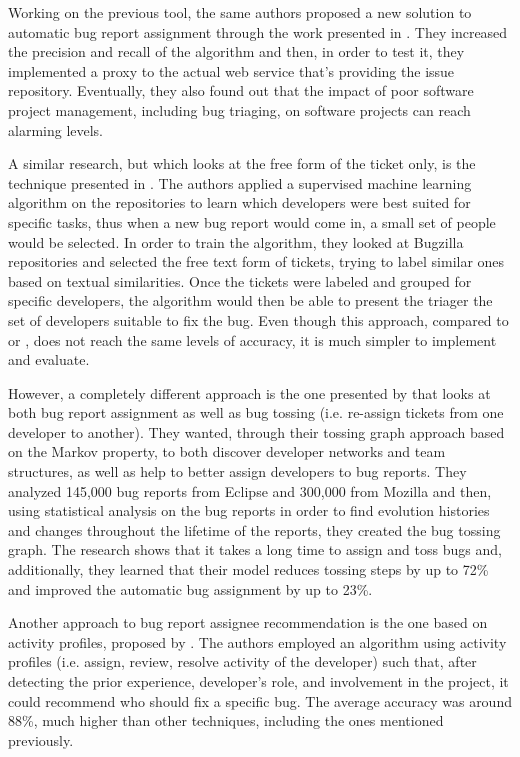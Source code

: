 \documentclass{mprop}
\begin{document}
Working on the previous tool, the same authors proposed a new solution to automatic
bug report assignment through the work presented in \citet{anvik2011reducing}.
They increased the precision and recall of the algorithm and then, in order to 
test it, they implemented a proxy to the actual web service that's providing the
issue repository. Eventually, they also found out that the impact of poor
software project management, including bug triaging, on software projects can
reach alarming levels.

A similar research, but which looks at the free form of the ticket only, is
the technique presented in \citet{anvik2006should}. The authors applied a 
supervised machine learning algorithm on the repositories to learn which 
developers were best suited for specific tasks, thus when a new bug report would 
come in, a small set of people would be selected. In order to train the algorithm,
they looked at Bugzilla repositories and selected the free text form of tickets, 
trying to label similar ones based on textual similarities. Once the tickets were
labeled and grouped for specific developers, the algorithm would then be able
to present the triager the set of developers suitable to fix the bug. Even though
this approach, compared to \citet{anvik2006automating} or 
\citet{anvik2011reducing}, does not reach the same levels of accuracy, it is much
simpler to implement and evaluate.

However, a completely different approach is the one presented by 
\citet{jeong2009improving} that looks at both bug report assignment as well as bug 
tossing (i.e. re-assign tickets from one developer to another). They wanted, 
through their tossing graph approach based on the Markov property, to both 
discover developer networks and team structures, as well as help to better assign 
developers to bug reports. They analyzed 145,000 bug reports from Eclipse and 
300,000 from Mozilla and then, using statistical analysis on the bug reports in 
order to find evolution histories and changes throughout the lifetime of the 
reports, they created the bug tossing graph. The research shows that it takes a 
long time to assign and toss bugs and, additionally, they learned that their model 
reduces tossing steps by up to 72\% and improved the automatic bug assignment by 
up to 23\%.

Another approach to bug report assignee recommendation is the one based on
activity profiles, proposed by \citet{Naguib2013BugReportAssignee}. The authors 
employed an algorithm using activity profiles (i.e. assign, review, resolve 
activity of the developer) such that, after detecting the prior
experience, developer's role, and involvement in the project, it could
recommend who should fix a specific bug. The average accuracy was around
88\%, much higher than other techniques, including the ones mentioned previously. 
\end{document}
